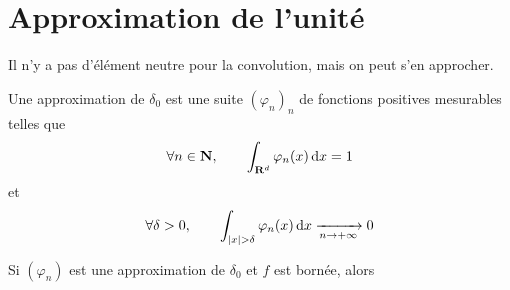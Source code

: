 \section{Approximation de l'unité}

Il n'y a pas d'élément neutre pour la convolution, mais on peut s'en approcher.

\begin{dfn}
    Une approximation de $\delta_0$ est une suite  $(\varphi_n)_n$ de fonctions positives mesurables telles que \[ \forall  n \in  \mathbf N, \qquad  \int_{\mathbf R^d}\varphi_n(x)\mathop{}\!\mathrm d x=1\] et \[\forall \delta>0, \qquad  \int_{|x|>\delta }\varphi_n(x)\diff x \xrightarrow[n\to+\infty]{}0\]
\end{dfn}

\begin{thm}
    Si $(\varphi_n)$ est une approximation de $\delta_0$ et $f$ est bornée, alors %
\end{thm}
